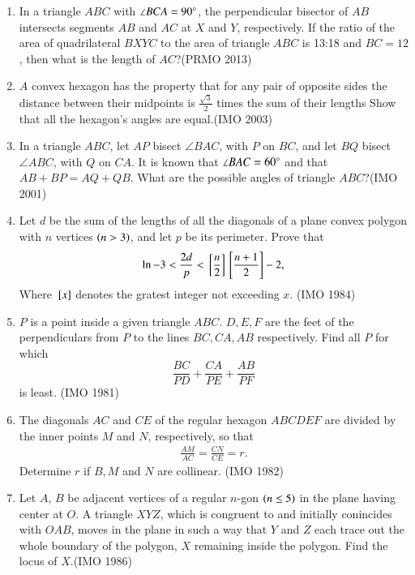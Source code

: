 \begin{enumerate}[label=\thesubsection.\arabic*,ref=\thesubsection.\theenumi]
\item In a triangle $ ABC $ with $ \angle BCA = 90\degree $, the perpendicular bisector of $ AB $ intersects segments $ AB $ and $ AC $ at $ X $ and $ Y $, respectively. If the ratio of the area of quadrilateral $ BXYC $ to the area of triangle $ ABC $ is 13:18 and $ BC = 12 $, then what is the length of $ AC $?\hfill(PRMO 2013)
\item $A$ convex hexagon has the property that for any pair of opposite sides the distance between their midpoints is $\frac{\sqrt{3}}{2}$ times the sum of their lengths Show that all the hexagon's angles are equal.\hfill(IMO 2003)
\item In a triangle $ABC$, let $AP$ bisect $\angle B AC$, with $P$ on $BC$, and let $BQ$ bisect $\angle A BC$, with $Q$ on $CA$. It is known that $\angle BAC= 60\degree$ and that $AB+BP=AQ+QB$. What are the possible angles of triangle $ABC$?\hfill(IMO 2001)
\item Let $d$ be the sum of the lengths of all the diagonals of a plane convex polygon with $n$ vertices $\left(n>3\right)$, and let $p$ be its perimeter. Prove that\begin{align*}                                    \ln -3<\frac{2d}{p}<{}\left[\frac{n}{2}\right]{}\left[\frac{n+1}{2}\right]-2,\end{align*}
		Where ${}\left[x\right]$ denotes the gratest integer not exceeding $x$.  \hfill(IMO 1984)
\item $P$ is a point inside a given triangle $ABC$. $D, E, F$ are the feet of the perpendiculars from $P$ to the lines $BC, CA, AB$ respectively. Find all $P$ for which $$\frac{BC}{PD}+\frac{CA}{PE}+\frac{AB}{PF}$$ is least. \hfill(IMO  1981)
 \item The diagonals $AC$ and $CE$ of the regular hexagon $ABCDEF$ are divided by the inner points $M$ and $N$, respectively, so that \begin{align*} \frac{AM}{AC}=\frac{CN}{CE}=r.
                   \end{align*}
 Determine $r$ if $B, M$ and $N$ are collinear. \hfill(IMO  1982)
    \item Let $A$, $B$ be adjacent vertices of a regular $n$-gon $\left(n\leq5\right)$ in the plane having center at $O$. A triangle $XYZ$, which is congruent to and initially conincides with $OAB$, moves in the plane in such a way that $Y$ and $Z$ each trace out the whole boundary of the polygon, $X$ remaining inside the polygon. Find the locus of $X$.\hfill(IMO  1986)


\end{enumerate}
